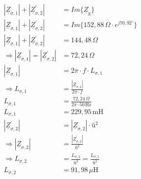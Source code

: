 {\begin{itemize}
\begin{minipage}[t]{0.49\linewidth}
\begin{align*}
					|\underline{Z}_{\sigma,1}| + |\underline{Z}_{\sigma,2}^\prime| &= Im \{ \underline{Z}_\mathrm{g} \}\\
					|\underline{Z}_{\sigma,1}| + |\underline{Z}_{\sigma,2}^\prime| &=Im\{ 152,88\,\Omega \cdot e^{j70,92^\circ} \}\\
					|\underline{Z}_{\sigma,1}| + |\underline{Z}_{\sigma,2}^\prime| &= 144,48\,\Omega\\
					\Rightarrow |\underline{Z}_{\sigma,1}| = |\underline{Z}_{\sigma,2}^\prime| &= 72,24\,\Omega\\
					|\underline{Z}_{\sigma,1}| &= 2\pi \cdot f \cdot L_{\sigma,1}\\
					\Rightarrow L_{\sigma,1} &= \frac{|\underline{Z}_{\sigma,1}|}{2\pi \cdot f}\\
					L_{\sigma,1} &= \frac{72,24\,\Omega}{2\pi \cdot 50\,\mathrm{Hz}}\\
					L_{\sigma,1} &= 229,95\,\mathrm{mH}\\
					|\underline{Z}_{\sigma,2}^\prime| &= |\underline{Z}_{\sigma,2}| \cdot \textit{ü}^2\\
					\Rightarrow |\underline{Z}_{\sigma,2}| &= \frac{|\underline{Z}_{\sigma,2}^\prime|}{\textit{ü}^2}\\
					\Rightarrow L_{\sigma,2} &= \frac{L_{\sigma,2}}{\textit{ü}^2} = \frac{L_{\sigma,1}}{\textit{ü}^2}\\
					L_{\sigma,2} &= 91,98\,\mu\mathrm{H}
				\end{align*}
			\end{minipage}
	\end{itemize}
}

